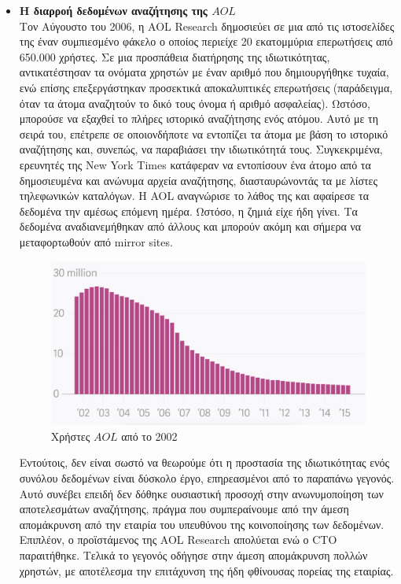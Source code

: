 \begin{itemize}
   
\item \textbf{Η διαρροή δεδομένων αναζήτησης της $AOL$}\\
Τον Αύγουστο του 2006, η \textlatin{AOL Research} δημοσιεύει σε μια από τις ιστοσελίδες της έναν συμπιεσμένο φάκελο ο οποίος περιείχε 20 εκατομμύρια επερωτήσεις από 650.000 χρήστες. Σε μια προσπάθεια διατήρησης της ιδιωτικότητας, αντικατέστησαν τα ονόματα χρηστών με έναν αριθμό που δημιουργήθηκε τυχαία, ενώ επίσης επεξεργάστηκαν προσεκτικά αποκαλυπτικές επερωτήσεις (παράδειγμα, όταν τα άτομα αναζητούν το δικό τους όνομα ή αριθμό ασφαλείας). Ωστόσο, μπορούσε να εξαχθεί το πλήρες ιστορικό αναζήτησης ενός ατόμου. Αυτό με τη σειρά του, επέτρεπε σε οποιονδήποτε να εντοπίζει τα άτομα με βάση το ιστορικό αναζήτησης και, συνεπώς, να παραβιάσει την ιδιωτικότητά τους. 
Συγκεκριμένα, ερευνητές της \textlatin{New York Times} κατάφεραν να εντοπίσουν ένα άτομο από τα δημοσιευμένα και ανώνυμα αρχεία αναζήτησης, διασταυρώνοντάς τα με λίστες τηλεφωνικών καταλόγων.
Η \textlatin{AOL} αναγνώρισε το λάθος της και αφαίρεσε τα δεδομένα την αμέσως επόμενη ημέρα. Ωστόσο, η ζημιά είχε ήδη γίνει. Τα δεδομένα αναδιανεμήθηκαν από άλλους και μπορούν ακόμη και σήμερα να μεταφορτωθούν από \textlatin{mirror sites}.
\begin{figure} [h!]
\begin{center}
  \includegraphics[scale=0.3]{images/AOL.jpg}
  \caption{Χρήστες $AOL$ από το 2002}
  \end{center}
\end{figure}


Εντούτοις, δεν είναι σωστό να θεωρούμε ότι η προστασία της ιδιωτικότητας ενός συνόλου δεδομένων είναι δύσκολο έργο, επηρεασμένοι από το παραπάνω γεγονός. Αυτό συνέβει επειδή δεν δόθηκε ουσιαστική προσοχή στην ανωνυμοποίηση των αποτελεσμάτων αναζήτησης, πράγμα που συμπεραίνουμε από την άμεση απομάκρυνση από την εταιρία του υπευθύνου της κοινοποίησης των δεδομένων. Επιπλέον, ο προϊστάμενος της \textlatin{AOL Research} απολύεται ενώ ο \textlatin{CTO} παραιτήθηκε. Τελικά το γεγονός οδήγησε στην άμεση απομάκρυνση πολλών χρηστών, με αποτέλεσμα την επιτάχυνση της ήδη φθίνουσας πορείας της εταιρίας. 



\end{itemize}
